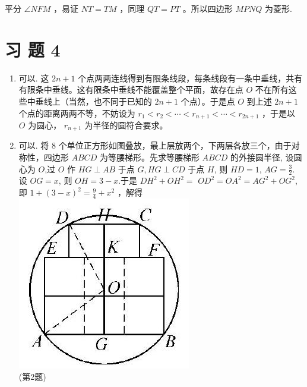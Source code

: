\documentclass[10pt]{article}
\begin{document}
平分 $\angle N F M$ ，易证 $N T=T M$ ，同理 $Q T=P T$ 。所以四边形 $M P N Q$ 为菱形.

\section*{习 题 4}
\begin{enumerate}
  \item 可以. 这 $2 n+1$ 个点两两连线得到有限条线段，每条线段有一条中垂线，共有有限条中垂线。这有限条中垂线不能覆盖整个平面，故存在点 $O$ 不在所有这些中垂线上（当然，也不同于已知的 $2 n+1$ 个点）。于是点 $O$ 到上述 $2 n+1$ 个点的距离两两不等，不妨设为 $r_{1}<r_{2}<\cdots<r_{n+1}<\cdots<r_{2 n+1}$ ，于是以 $O$ 为圆心， $r_{n+1}$ 为半径的圆符合要求。
  \item 可以. 将 8 个单位正方形如图叠放，最上层放两个，下两层各放三个，由于对称性，四边形 $A B C D$ 为等腰梯形。先求等腰梯形 $A B C D$ 的外接圆半径, 设圆心为 $O$,过 $O$ 作 $H G \perp A B$ 于点 $G, H G \perp C D$ 于点 $H$, 则 $H D=1$, $A G=\frac{3}{2}$. 设 $O G=x$, 则 $O H=3-x$.于是 $D H^{2}+O H^{2}=$ $O D^{2}=O A^{2}=A G^{2}+O G^{2}$, 即 $1+(3-x)^{2}=\frac{9}{4}+x^{2}$ ，解得\\
\includegraphics[max width=\textwidth, center]{2024_10_30_66b8e5e701da2093c133g-091}\\
(第2题)\\

\end{enumerate}
\end{document}
